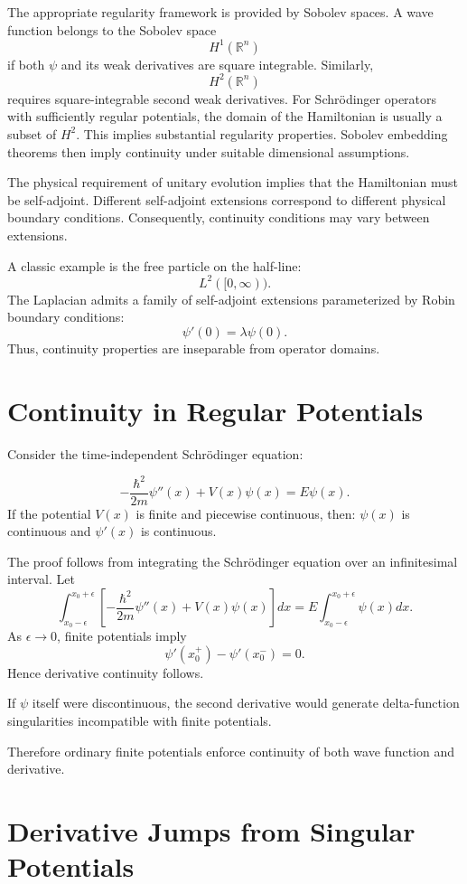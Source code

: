 \documentclass[11pt]{article}
\begin{document}
The appropriate regularity framework is provided by Sobolev spaces.
A wave function belongs to the Sobolev space
\[
H^1(\mathbb R^n)
\]
if both \(\psi\) and its weak derivatives are square integrable.
Similarly,
\[
H^2(\mathbb R^n)
\]
requires square-integrable second weak derivatives.
For Schrödinger operators with sufficiently regular potentials, the domain 
of the Hamiltonian is usually a subset of \(H^2\). This implies substantial
regularity properties.
Sobolev embedding theorems then imply continuity under suitable 
dimensional assumptions.

The physical requirement of unitary evolution implies that the 
Hamiltonian must be self-adjoint.
Different self-adjoint extensions correspond to different physical 
boundary conditions. Consequently, continuity conditions may vary 
between extensions.

A classic example is the free particle on the half-line:
\[
L^2([0,\infty)).
\]
The Laplacian admits a family of self-adjoint extensions parameterized 
by Robin boundary conditions:
\[
\psi'(0)=\lambda \psi(0).
\]
Thus, continuity properties are inseparable from operator domains.
\section{Continuity in Regular Potentials}

Consider the time-independent Schrödinger equation:

\[
-\frac{\hbar^2}{2m}\psi''(x)+V(x)\psi(x)=E\psi(x).
\]
If the potential \(V(x)\) is finite and piecewise continuous, then:
\(\psi(x)\) is continuous and \(\psi'(x)\) is continuous.

The proof follows from integrating the Schrödinger equation over an infinitesimal interval.
Let
\[
\int_{x_0-\epsilon}^{x_0+\epsilon}
\left[-\frac{\hbar^2}{2m}\psi''(x)
+V(x)\psi(x)\right]dx
=
E\int_{x_0-\epsilon}^{x_0+\epsilon}\psi(x)dx.
\]
As \(\epsilon\to0\), finite potentials imply
\[
\psi'(x_0^+) - \psi'(x_0^-)=0.
\]
Hence derivative continuity follows.

If \(\psi\) itself were discontinuous, the second derivative would generate 
delta-function singularities incompatible with finite potentials.

Therefore ordinary finite potentials enforce continuity of both wave 
function and derivative.

\section{ Derivative Jumps from Singular Potentials}
\end{document}
